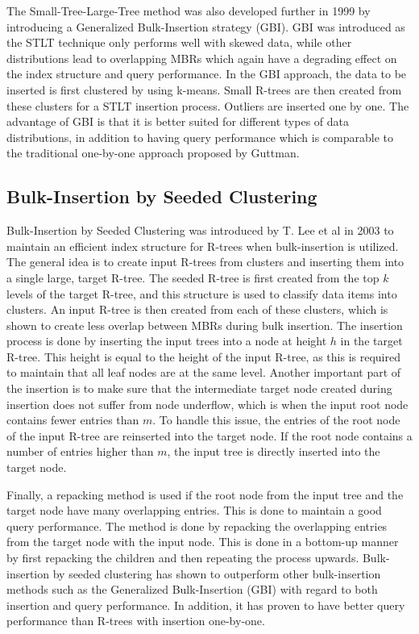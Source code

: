 The Small-Tree-Large-Tree method was also developed further in 1999 by introducing a Generalized Bulk-Insertion strategy (GBI)\cite{GBI}. GBI was introduced as the STLT technique only performs well with skewed data, while other distributions lead to overlapping MBRs which again have a degrading effect on the index structure and query performance. In the GBI approach, the data to be inserted is first clustered by using k-means. Small R-trees are then created from these clusters for a STLT insertion process. Outliers are inserted one by one. The advantage of GBI is that it is better suited for different types of data distributions, in addition to having query performance which is comparable to the traditional one-by-one approach proposed by Guttman\cite{r-tree}.

\subsection{Bulk-Insertion by Seeded Clustering}
Bulk-Insertion by Seeded Clustering was introduced by T. Lee et al in 2003 to maintain an efficient index structure for R-trees when bulk-insertion is utilized\cite{SeededClustering}. The general idea is to create input R-trees from clusters and inserting them into a single large, target R-tree. The seeded R-tree is first created from the top $k$ levels of the target R-tree, and this structure is used to classify data items into clusters. An input R-tree is then created from each of these clusters, which is shown to create less overlap between MBRs during bulk insertion. The insertion process is done by inserting the input trees into a node at height $h$ in the target R-tree. This height is equal to the height of the input R-tree, as this is required to maintain that all leaf nodes are at the same level. Another important part of the insertion is to make sure that the intermediate target node created during insertion does not suffer from node underflow, which is when the input root node contains fewer entries than $m$. To handle this issue, the entries of the root node of the input R-tree are reinserted into the target node. If the root node contains a number of entries higher than $m$, the input tree is directly inserted into the target node.\newline

Finally, a repacking method is used if the root node from the input tree and the target node have many overlapping entries. This is done to maintain a good query performance. The method is done by repacking the overlapping entries from the target node with the input node. This is done in a bottom-up manner by first repacking the children and then repeating the process upwards. Bulk-insertion by seeded clustering has shown to outperform other bulk-insertion methods such as the Generalized Bulk-Insertion (GBI) with regard to both insertion and query performance. In addition, it has proven to have better query performance than R-trees with insertion one-by-one\cite{SeededClustering}.


